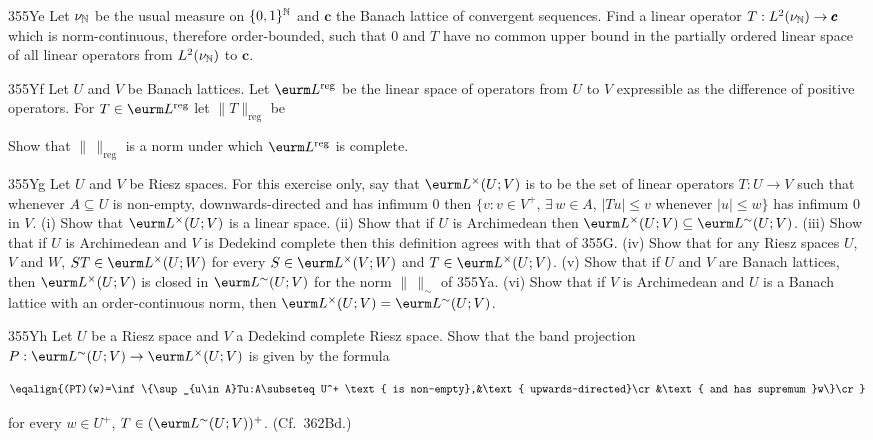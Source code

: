 {\spheader 355Ye Let $\nu_{\Bbb N}$ be the usual measure on
$\{0,1\}^{\Bbb N}$ and
$\pmb{c}$ the Banach lattice of convergent sequences.   Find a
linear operator $T:L^2(\nu_{\Bbb N})\to\pmb{c}$ which is norm-continuous,
therefore
order-bounded, such that $0$ and $T$ have no common upper bound in the
partially ordered linear space
of all linear operators from $L^2(\nu_{\Bbb N})$ to $\pmb{c}$.

\spheader 355Yf Let $U$ and $V$ be Banach lattices.   Let
$\eurm L^{\text{reg}}$ be the linear space of operators from $U$ to $V$
expressible as the difference of positive operators.   For
$T\in\eurm L^{\text{reg}}$ let $\|T\|_{\text{reg}}$ be


\noindent Show that $\|\,\|_{\text{reg}}$ is a norm under which
$\eurm L^{\text{reg}}$ is complete.

\spheader 355Yg Let $U$ and $V$ be Riesz spaces.   For this exercise
only, say that $\eurm L^{\times}(U;V)$ is to be the set
of linear operators $T:U\to V$ such that whenever $A\subseteq U$ is
non-empty,
downwards-directed and has infimum $0$ then $\{v:v\in
V^+,\,\exists\,w\in
A,\,|Tu|\le v$ whenever $|u|\le w\}$ has infimum $0$ in $V$.   (i) Show
that $\eurm L^{\times}(U;V)$ is a linear space.   (ii) Show that if $U$
is Archimedean then $\eurm L^{\times}(U;V)\subseteq\eurm L^{\sim}(U;V)$.
(iii) Show that if $U$ is Archimedean and $V$ is Dedekind complete then
this definition agrees with that of 355G.   (iv) Show that for any Riesz
spaces $U$, $V$ and $W$, $ST\in\eurm L^{\times}(U;W)$ for every
$S\in\eurm L^{\times}(V;W)$ and $T\in\eurm L^{\times}(U;V)$.   (v) Show
that if $U$ and $V$ are Banach lattices, then $\eurm L^{\times}(U;V)$ is
closed in $\eurm L^{\sim}(U;V)$ for the norm $\|\,\|_{\sim}$
of 355Ya.   (vi) Show that if $V$ is Archimedean and $U$ is a Banach
lattice with an order-continuous norm, then $\eurm L^{\times}(U;V)=\eurm
L^{\sim}(U;V)$.

\spheader 355Yh Let $U$ be a Riesz space and $V$ a Dedekind complete
Riesz space.   Show that the band projection
$P:\eurm L^{\sim}(U;V)\to\eurm L^{\times}(U;V)$ is given by the formula

$$\eqalign{(PT)(w)=\inf\{\sup_{u\in A}Tu:A\subseteq U^+
\text{ is non-empty},&\text{ upwards-directed}\cr
&\text{ and has supremum }w\}\cr}$$

\noindent for every $w\in U^+$, $T\in(\eurm L^{\sim}(U;V))^+$.   (Cf.\
362Bd.)


}
